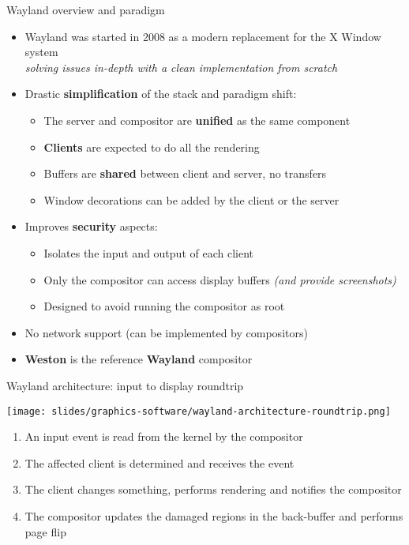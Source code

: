 \begin{frame}{Wayland overview and paradigm}
  \begin{itemize}
  \item Wayland was started in 2008 as a modern replacement for the X Window system\\
    \textit{solving issues in-depth with a clean implementation from scratch}
  \item Drastic \textbf{simplification} of the stack and paradigm shift:
    \begin{itemize}
    \item The server and compositor are \textbf{unified} as the same component
    \item \textbf{Clients} are expected to do all the rendering
    \item Buffers are \textbf{shared} between client and server, no transfers
    \item Window decorations can be added by the client or the server
    \end{itemize}
  \item Improves \textbf{security} aspects:
    \begin{itemize}
    \item Isolates the input and output of each client
    \item Only the compositor can access display buffers \textit{(and provide screenshots)}
    \item Designed to avoid running the compositor as root
    \end{itemize}
  \item No network support (can be implemented by compositors)
  \item \textbf{Weston} is the reference \textbf{Wayland} compositor
  \end{itemize}
\end{frame}

\begin{frame}{Wayland architecture: input to display roundtrip}
  \begin{minipage}{0.49\textwidth}
    \centering
    \texttt{[image: slides/graphics-software/wayland-architecture-roundtrip.png]}
  \end{minipage}
  \hfill
  \begin{minipage}{0.49\textwidth}
    \begin{enumerate}
    \item An input event is read from the kernel by the compositor
    \item The affected client is determined and receives the event
    \item The client changes something, performs rendering and notifies the compositor
    \item The compositor updates the damaged regions in the back-buffer and performs page flip
    \end{enumerate}
  \end{minipage}
\end{frame}

